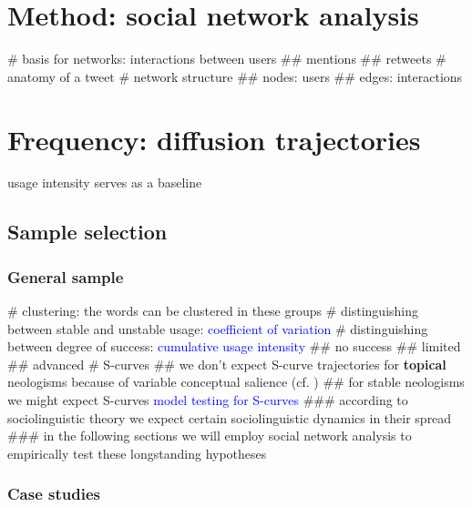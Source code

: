 \documentclass[
  a4paper,
  ]{scrartcl}
\newcommand{\hw}[1]{\textbf{#1}}
\newcommand{\mtrc}[1]{\textcolor{blue}{#1}}
\begin{document}
\section{Method: social network analysis}

  \begin{easylist}[itemize]
    # basis for networks: interactions between users
      ## mentions
      ## retweets
    # anatomy of a tweet
    # network structure
      ## nodes: users
      ## edges: interactions
  \end{easylist}

\section{Frequency: diffusion trajectories}

  usage intensity serves as a baseline

  \subsection{Sample selection}

    \subsubsection{General sample}

      \begin{easylist}[itemize]
        # clustering: the words can be clustered in these groups \parencite{Kerremans2015}
        # distinguishing between stable and unstable usage: \mtrc{coefficient of variation}
        # distinguishing between degree of success: \mtrc{cumulative usage intensity}
          ## no success
          ## limited
          ## advanced
      # S-curves
        ## we don't expect S-curve trajectories for \hw{topical} neologisms because of variable conceptual salience (cf. \cite{Nini2017})
        ## for stable neologisms we might expect S-curves \mtrc{model testing for S-curves}
          ### according to sociolinguistic theory we expect certain sociolinguistic dynamics in their spread
          ### in the following sections we will employ social network analysis to empirically test these longstanding hypotheses
      \end{easylist}

    \subsubsection{Case studies}
\end{document}
